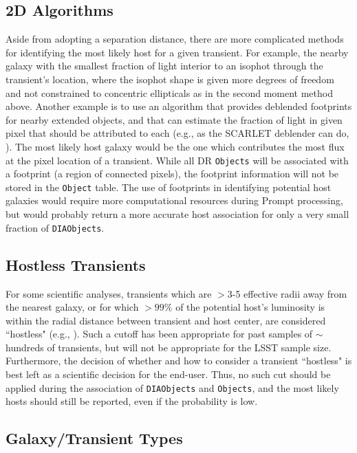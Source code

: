 \documentclass[DM,authoryear,toc]{lsstdoc}
\begin{document}
\subsection{2D Algorithms}

Aside from adopting a separation distance, there are more complicated methods for identifying the most likely host for a given transient.
For example, the nearby galaxy with the smallest fraction of light interior to an isophot through the transient's location, where the isophot shape is given more degrees of freedom and not constrained to concentric ellipticals as in the second moment method above.
Another example is to use an algorithm that provides deblended footprints for nearby extended objects, and that can estimate the fraction of light in given pixel that should be attributed to each (e.g., as the SCARLET deblender can do, \cite{2018A&C....24..129M}).
The most likely host galaxy would be the one which contributes the most flux at the pixel location of a transient.
While all DR {\tt Objects} will be associated with a footprint (a region of connected pixels), the footprint information will not be stored in the {\tt Object} table.
The use of footprints in identifying potential host galaxies would require more computational resources during Prompt processing, but would probably return a more accurate host association for only a very small fraction of {\tt DIAObjects}. 

\subsection{Hostless Transients}

For some scientific analyses, transients which are $>$3-5 effective radii away from the nearest galaxy, or for which $>99\%$ of the potential host's luminosity is within the radial distance between transient and host center, are considered ``hostless" (e.g., \citealt{2011ApJ...729..142S}).
Such a cutoff has been appropriate for past samples of $\sim$hundreds of transients, but will not be appropriate for the LSST sample size.
Furthermore, the decision of whether and how to consider a transient ``hostless" is best left as a scientific decision for the end-user.
Thus, no such cut should be applied during the association of {\tt DIAObjects} and {\tt Objects}, and the most likely hosts should still be reported, even if the probability is low.

\subsection{Galaxy/Transient Types}
\end{document}
